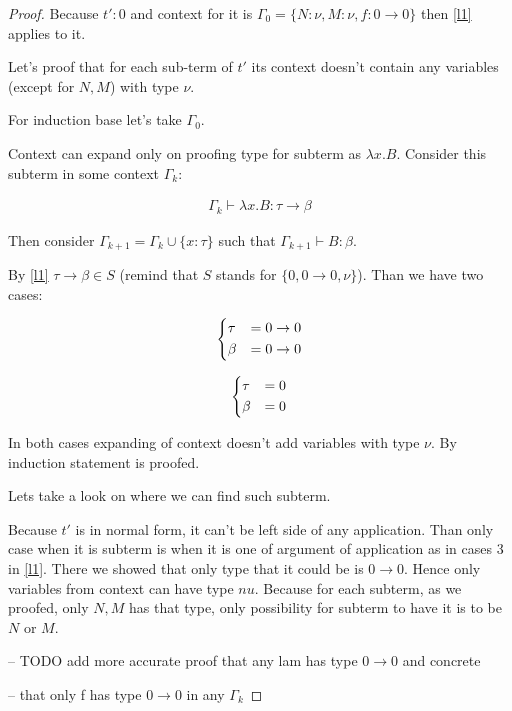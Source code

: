 \documentclass[11pt]{article}
\newcommand{\gb}{\beta}
\newcommand{\gl}{\lambda}
\newcommand{\gt}{\tau}
\newcommand{\too}{\rightarrow}
\begin{document}
\begin{proof}

    Because \(t' : 0\) and context for it is \(\Gamma_0 = \{N : \nu, M : \nu, f : 0 \too 0\}\) then \cref{l1} applies to it.

    Let's proof that for each sub-term of \(t'\) its context doesn't contain any variables (except for \(N, M\)) with type \(\nu\).
    
    For induction base let's take \(\Gamma_0\).

    Context can expand only on proofing type for subterm as \(\gl x. B\). Consider this subterm in some context \(\Gamma_k\): 

    \begin{align}
        \Gamma_k \vdash \gl x.B : \gt \too \gb
    \end{align}

    Then consider \(\Gamma_{k + 1} = \Gamma_k \cup \{x : \gt\}\) such that \(\Gamma_{k + 1} \vdash B : \gb\).

    By \cref{l1} \(\gt \too \gb \in S\) (remind that \(S\) stands for \(\{0, 0 \too 0, \nu\}\)). Than we have two cases:

    \begin{align*}
        \begin{dcases}
            \gt &= 0 \too 0 \\
            \gb &= 0 \too 0
        \end{dcases}
    \end{align*}

    \begin{align*}
        \begin{dcases}
            \gt &= 0 \\
            \gb &= 0
        \end{dcases}    
    \end{align*}

    In both cases expanding of context doesn't add variables with type \(\nu\).
    By induction statement is proofed.


    Lets take a look on where we can find such subterm. 
    
    Because \(t'\) is in normal form, it can't be left side of any application.
    Than only case when it is subterm is when it is one of argument of application as
    in cases 3 in \cref{l1}. There we showed that only type that it could be is \(0 \too 0\).
    Hence only variables from context can have type \(nu\). Because for each subterm, as we proofed,
    only \(N, M\) has that type, only possibility for subterm to have it is to be \(N\) or \(M\).

    \hfill \break

    -- TODO add more accurate proof that any lam has type \(0 \too 0\) and concrete

    -- that only f has type \(0 \too 0\) in any \(\Gamma_k\)


\end{proof}
\end{document}
